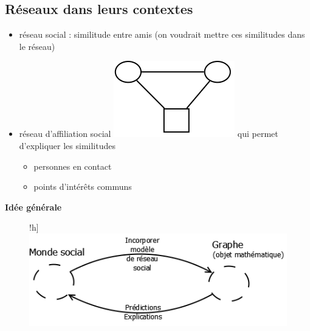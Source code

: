 \subsection{Réseaux dans leurs contextes}
\begin{itemize}
\item réseau social : similitude entre amis (on voudrait mettre ces similitudes dans le réseau)
\item réseau d'affiliation social \includegraphics[scale=0.05]{images/21_Sim.png} qui permet d'expliquer les similitudes
	\begin{itemize}
	\item personnes en contact
	\item points d'intérêts communs
	\end{itemize}
\end{itemize}

\vspace{1ex}
\textbf{Idée générale}

\begin{figure}!h]
	\centering
	\includegraphics[scale=0.4]{images/21_IdeeGenerale.png}
\end{figure}


